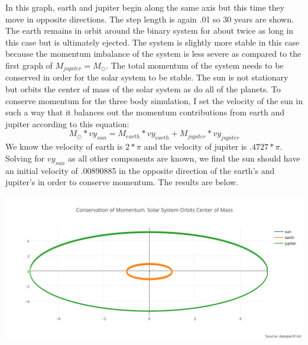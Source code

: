 \documentclass[11pt,a4wide]{article}
\begin{document}
\begin{enumerate}
In this graph, earth and jupiter begin along the same axis but this time they move in opposite directions. The step length is again .01 so 30 years are shown. The earth remains in orbit around the binary system for about twice as long in this case but is ultimately ejected. The system is slightly more stable in this case because the momentum imbalance of the system is less severe as compared to the first graph of $M_{jupiter}=M_{\odot}$. \newline
The total momentum of the system needs to be conserved in order for the solar system to be stable. The sun is not stationary but orbits the center of mass of the solar system as do all of the planets. To conserve momentum for the three body simulation, I set the velocity of the sun in such a way that it balances out the momentum contributions from earth and jupiter according to this equation: 
\[
M_{\odot}*vy_{sun}=M_{earth}*vy_{earth} + M_{jupiter}*vy_{jupiter}
\]
We know the velocity of earth is $2*\pi$ and the velocity of jupiter is $.4727*\pi$. Solving for $vy_{sun}$ as all other components are known, we find the sun should have an initial velocity of .00890885 in the opposite direction of the earth's and jupiter's in order to conserve momentum. The results are below.

\includegraphics[width=6in]{conservation_of_momentum_solar_system_orbits_center_of_mass.png}\\


\end{enumerate}
\end{document}

